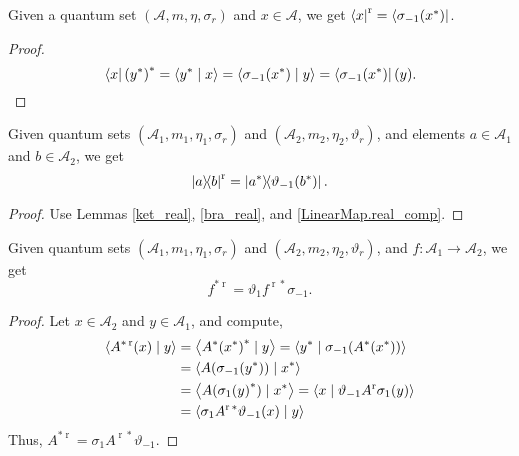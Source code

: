  \begin{lemma}\label{bra_real}\leanok
  Given a quantum set $(\mathcal{A},m,\eta,\sigma_r)$ and $x\in\mathcal{A}$, we get $\left\langle x\right\rvert^{\operatorname{r}}=\left\langle\sigma_{-1}(x^*)\right\rvert$.
 \end{lemma}
 \begin{proof}\leanok
  \[{\left\langle x\right\rvert(y^*)}^*=\left\langle y^* \mid x\right\rangle=\left\langle\sigma_{-1}(x^*) \mid y\right\rangle=\left\langle\sigma_{-1}(x^*)\right\rvert(y).\]
 \end{proof}
 \begin{corollary}\label{rankOne_real}
  \leanok
  Given quantum sets $(\mathcal{A}_1,m_1,\eta_1,\sigma_r)$ and $(\mathcal{A}_2,m_2,\eta_2,\vartheta_r)$, and elements $a\in\mathcal{A}_1$ and $b\in\mathcal{A}_2$, we get
  \[\left\lvert a\right\rangle\!\!\left\langle b\right\rvert^{\operatorname{r}}=\left\lvert a^*\right\rangle\!\!\left\langle\vartheta_{-1}(b^*)\right\rvert.\]
 \end{corollary}
 \begin{proof}\leanok
  Use Lemmas \ref{ket_real}, \ref{bra_real}, and \ref{LinearMap.real_comp}.
 \end{proof}

 \begin{proposition}\label{LinearMap.adjoint_real_eq}
  \leanok
  Given quantum sets $(\mathcal{A}_1,m_1,\eta_1,\sigma_r)$ and $(\mathcal{A}_2,m_2,\eta_2,\vartheta_r)$, and $f\colon\mathcal{A}_1\to\mathcal{A}_2$, we get
  \[ f^{*\operatorname{r}}=\vartheta_1f^{\operatorname{r}*}\sigma_{-1}.\]
 \end{proposition}
 \begin{proof}\leanok
  Let $x\in{\mathcal{A}_2}$ and $y\in \mathcal{A}_1$, and compute,
  \begin{align*}
   \left\langle{A^{*\operatorname{r}}}(x) \mid y\right\rangle &= \left\langle{A^*(x^*)}^* \mid y\right\rangle =\left\langle y^* \mid \sigma_{-1}(A^*(x^*))\right\rangle\\
   &= \left\langle A(\sigma_{-1}(y^*)) \mid x^*\right\rangle\\
   &= \left\langle A({\sigma_{1}(y)}^*) \mid x^*\right\rangle
   = \left\langle x \mid \vartheta_{-1}A^{\operatorname{r}}\sigma_{1}(y)\right\rangle\\
   &= \left\langle\sigma_{1}A^{\operatorname{r}*}\vartheta_{-1}(x) \mid y\right\rangle
  \end{align*}
  Thus, $A^{*\operatorname{r}}=\sigma_{1}A^{\operatorname{r}*}\vartheta_{-1}$.
 \end{proof}

